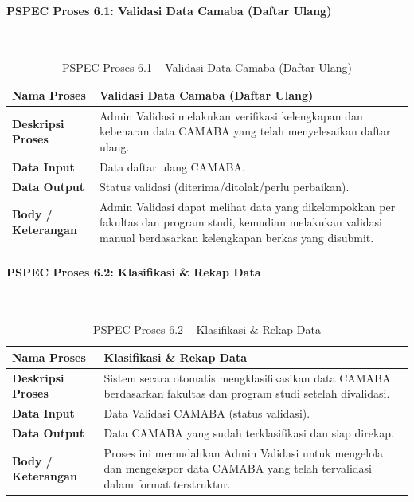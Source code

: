 \paragraph{PSPEC Proses 6.1: Validasi Data Camaba (Daftar Ulang)}~\\
\begin{longtable}{|p{}|p{}|}
	\caption{PSPEC Proses 6.1 -- Validasi Data Camaba (Daftar Ulang)}
	\label{table:3.pspec61}\\
	\hline
	\textbf{Nama Proses} & Validasi Data Camaba (Daftar Ulang) \\
	\hline
	\textbf{Deskripsi Proses} & Admin Validasi melakukan verifikasi kelengkapan dan kebenaran data CAMABA yang telah menyelesaikan daftar ulang. \\
	\hline
	\textbf{Data Input} & Data daftar ulang CAMABA. \\
	\hline
	\textbf{Data Output} & Status validasi (diterima/ditolak/perlu perbaikan). \\
	\hline
	\textbf{Body / Keterangan} & Admin Validasi dapat melihat data yang dikelompokkan per fakultas dan program studi, kemudian melakukan validasi manual berdasarkan kelengkapan berkas yang disubmit. \\
	\hline
\end{longtable}

\paragraph{PSPEC Proses 6.2: Klasifikasi \& Rekap Data}~\\
\begin{longtable}{|p{}|p{}|}
	\caption{PSPEC Proses 6.2 -- Klasifikasi \& Rekap Data}
	\label{table:3.pspec62}\\
	\hline
	\textbf{Nama Proses} & Klasifikasi \& Rekap Data \\
	\hline
	\textbf{Deskripsi Proses} & Sistem secara otomatis mengklasifikasikan data CAMABA berdasarkan fakultas dan program studi setelah divalidasi. \\
	\hline
	\textbf{Data Input} & Data Validasi CAMABA (status validasi). \\
	\hline
	\textbf{Data Output} & Data CAMABA yang sudah terklasifikasi dan siap direkap. \\
	\hline
	\textbf{Body / Keterangan} & Proses ini memudahkan Admin Validasi untuk mengelola dan mengekspor data CAMABA yang telah tervalidasi dalam format terstruktur. \\
	\hline
\end{longtable}

